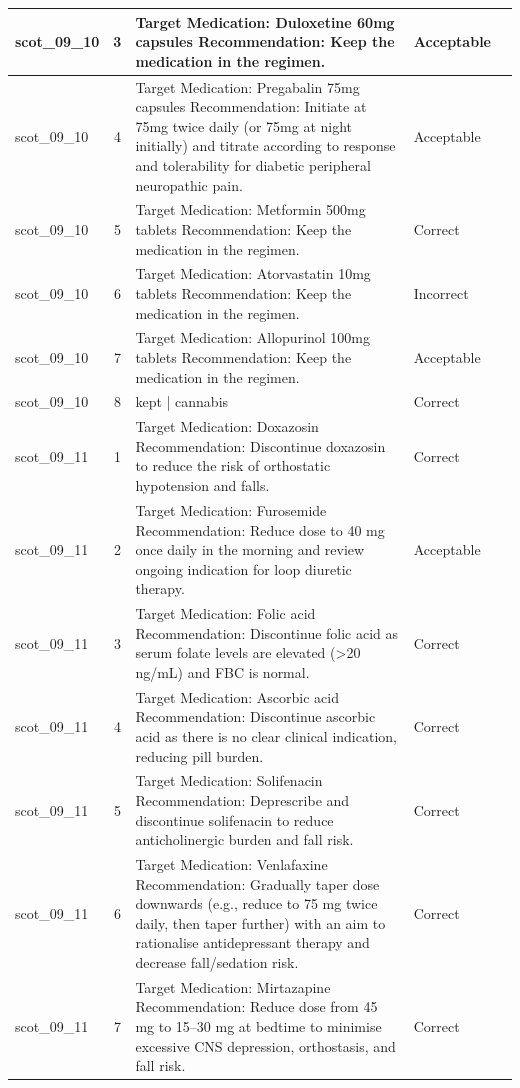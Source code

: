 \begin{longtable}{|p{1.45cm}|c|p{10.2cm}|p{1.55cm}|p{2.3cm}|}
\hline
scot\_09\_10 & 3 & Target Medication: Duloxetine 60mg capsules Recommendation: Keep the medication in the regimen. & Acceptable &  \\
\hline
scot\_09\_10 & 4 & Target Medication: Pregabalin 75mg capsules Recommendation: Initiate at 75mg twice daily (or 75mg at night initially) and titrate according to response and tolerability for diabetic peripheral neuropathic pain. & Acceptable &  \\
\hline
scot\_09\_10 & 5 & Target Medication: Metformin 500mg tablets Recommendation: Keep the medication in the regimen. & Correct &  \\
\hline
scot\_09\_10 & 6 & Target Medication: Atorvastatin 10mg tablets Recommendation: Keep the medication in the regimen. & Incorrect &  \\
\hline
scot\_09\_10 & 7 & Target Medication: Allopurinol 100mg tablets Recommendation: Keep the medication in the regimen. & Acceptable &  \\
\hline
scot\_09\_10 & 8 & kept | cannabis & Correct &  \\
\hline
scot\_09\_11 & 1 & Target Medication: Doxazosin Recommendation: Discontinue doxazosin to reduce the risk of orthostatic hypotension and falls. & Correct &  \\
\hline
scot\_09\_11 & 2 & Target Medication: Furosemide Recommendation: Reduce dose to 40 mg once daily in the morning and review ongoing indication for loop diuretic therapy. & Acceptable &  \\
\hline
scot\_09\_11 & 3 & Target Medication: Folic acid Recommendation: Discontinue folic acid as serum folate levels are elevated (>20 ng/mL) and FBC is normal. & Correct &  \\
\hline
scot\_09\_11 & 4 & Target Medication: Ascorbic acid Recommendation: Discontinue ascorbic acid as there is no clear clinical indication, reducing pill burden. & Correct &  \\
\hline
scot\_09\_11 & 5 & Target Medication: Solifenacin Recommendation: Deprescribe and discontinue solifenacin to reduce anticholinergic burden and fall risk. & Correct &  \\
\hline
scot\_09\_11 & 6 & Target Medication: Venlafaxine Recommendation: Gradually taper dose downwards (e.g., reduce to 75 mg twice daily, then taper further) with an aim to rationalise antidepressant therapy and decrease fall/sedation risk. & Correct &  \\
\hline
scot\_09\_11 & 7 & Target Medication: Mirtazapine Recommendation: Reduce dose from 45 mg to 15–30 mg at bedtime to minimise excessive CNS depression, orthostasis, and fall risk. & Correct &  \\

\end{longtable}
